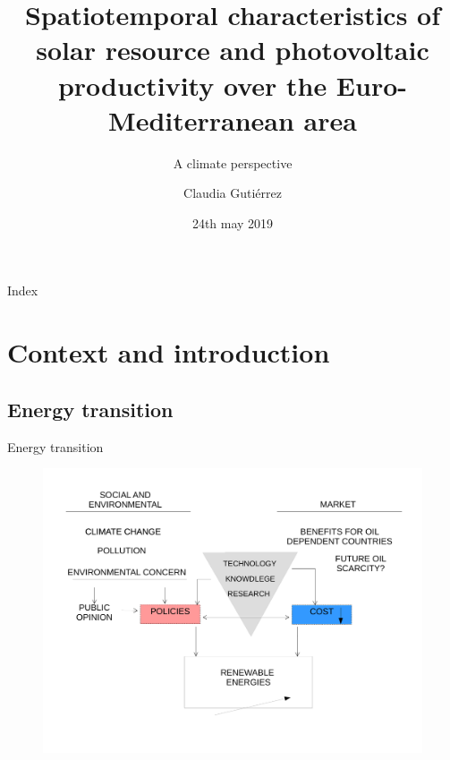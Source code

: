 \documentclass{beamer}%
\title{Spatiotemporal characteristics of solar resource and photovoltaic productivity over the Euro-Mediterranean area}
\subtitle{A climate perspective}
\date{24th may 2019}
\author{Claudia Guti\'errez}
\institute[ICAM] %
 {
   \inst{1}
   Facultad de Ciencias Ambientales y Bioqu\'imica\\
   Universidad de Castilla-La Mancha, Toledo, Spain
}
\begin{document}
\maketitle

\begin{frame}[plain]{Index}                                                                                              \tableofcontents                                                                                                       %
\end{frame}

\section{Context and introduction}

\subsection{Energy transition}

\begin{frame}[fragile]{Energy transition}
\begin{figure}
\centering\includegraphics[scale=0.4]{contexto.pdf}
\end{figure}
\end{frame}
\end{document}
